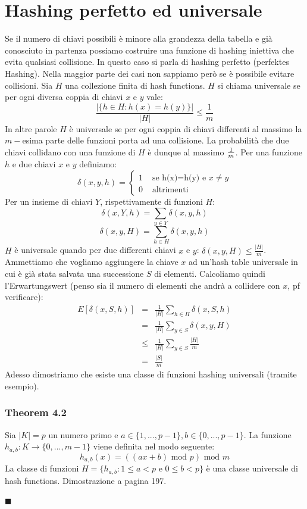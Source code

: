 \documentclass[a4paper]{book}
\newenvironment{mytheorem}[1]{\subsubsection*{Theorem #1}}{\begin{flushright}$\blacksquare$\end{flushright}}
\begin{document}
\section{Hashing perfetto ed universale}
Se il numero di chiavi possibili è minore alla grandezza della tabella e già conosciuto in partenza possiamo costruire una funzione di hashing iniettiva che evita qualsiasi collisione. In questo caso si parla di hashing perfetto (perfektes Hashing).
Nella maggior parte dei casi non sappiamo però se è possibile evitare collisioni. Sia $H$ una collezione finita di hash functions. $H$ si chiama universale se per ogni diversa coppia di chiavi $x$ e $y$ vale:
$$ \frac{|\{h\in H: h(x)=h(y)\}|}{|H|} \leq \frac{1}{m}$$
In altre parole $H$ è universale se per ogni coppia di chiavi differenti al massimo la $m-$esima parte delle funzioni porta ad una collisione. La probabilità che due chiavi collidano con una funzione di $H$ è dunque al massimo $1\over m$. Per una funzione $h$ e due chiavi $x$ e $y$ definiamo:
$$
\delta (x,y,h) =
\left\{
\begin{array}{rl}
1 & \mbox{ se h(x)=h(y) e } x\neq y  \\
0 & \mbox{ altrimenti}
\end{array}
\right.
$$
Per un insieme di chiavi $Y$, rispettivamente di funzioni $H$:
$$\delta (x,Y,h)= \sum_{y \in Y} \delta (x,y,h)$$
$$\delta (x,y,H)= \sum_{h \in H} \delta (x,y,h)$$
$H$ è universale quando per due differenti chiavi $x$ e $y$: $\delta (x,y,H) \leq \frac{|H|}{m}$.
Ammettiamo che vogliamo aggiungere la chiave $x$ ad un'hash table universale in cui è già stata salvata una successione $S$ di elementi. Calcoliamo quindi l'Erwartungswert (penso sia il numero di elementi che andrà a collidere con $x$, pf verificare):
\begin{eqnarray}
E[\delta (x,S,h)] &=& \frac{1}{|H|} \sum_{h \in H} \delta (x,S,h) \nonumber \\
&=& \frac{1}{|H|} \sum_{y \in S} \delta (x,y,H) \nonumber \\
&\leq & \frac{1}{|H|} \sum_{y \in S} \frac{|H|}{m} \nonumber \\
&=& \frac{|S|}{m}
\end{eqnarray}
Adesso dimostriamo che esiste una classe di funzioni hashing universali (tramite esempio).
\begin{mytheorem}{4.2}
Sia $|K|=p$ un numero primo e $a \in \{1, ..., p-1\},b \in \{0, ..., p-1\}$. La funzione $h_{a,b}: K \rightarrow \{0, ..., m-1\}$ viene definita nel modo seguente:
$$ h_{a,b}(x)=((ax+b) \mbox{ mod } p) \mbox{ mod } m$$
La classe di funzioni $H=\{h_{a,b} : 1\leq a < p \mbox{ e } 0\leq b <p\}$ è una classe universale di hash functions. Dimostrazione a pagina 197.
\end{mytheorem}
\end{document}
